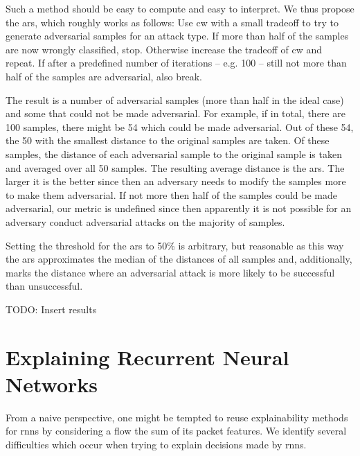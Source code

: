 \documentclass[conference]{IEEEtran}
\newcommand\note[2]{{\color{#1}#2}}
\newcommand\todo[1]{{\note{red}{TODO: #1}}}
\begin{document}
Such a method should be easy to compute and easy to interpret. We thus propose the \gls{ars}, which roughly works as follows: Use \gls{cw} with a small tradeoff to try to generate adversarial samples for an attack type. If more than half of the samples are now wrongly classified, stop. Otherwise increase the tradeoff of \gls{cw} and repeat. If after a predefined number of iterations -- e.g. 100 -- still not more than half of the samples are adversarial, also break. 

The result is a number of adversarial samples (more than half in the ideal case) and some that could not be made adversarial. For example, if in total, there are 100 samples, there might be 54 which could be made adversarial. Out of these 54, the 50 with the smallest distance to the original samples are taken. Of these samples, the distance of each adversarial sample to the original sample is taken and averaged over all 50 samples. The resulting average distance is the \gls{ars}. The larger it is the better since then an adversary needs to modify the samples more to make them adversarial. If not more then half of the samples could be made adversarial, our metric is undefined since then apparently it is not possible for an adversary conduct adversarial attacks on the majority of samples.

Setting the threshold for the \gls{ars} to 50\% is arbitrary, but
 reasonable as this way the \gls{ars} approximates the median of the distances of all samples and, additionally, marks the distance where an adversarial attack is more likely to be successful than unsuccessful.

\todo{Insert results}

\section{Explaining Recurrent Neural Networks}
From a naive perspective, one might be tempted to reuse explainability methods for \glspl{rnn} by considering a flow the sum of its packet features.
We identify several difficulties which occur when trying to explain decisions made by \glspl{rnn}. 
\end{document}

